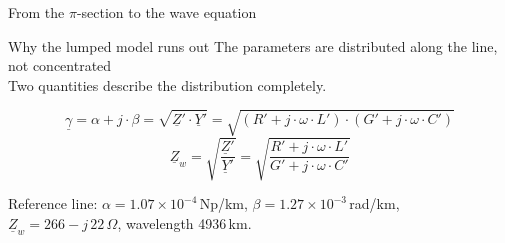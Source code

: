 %
\providecommand{\acfig}[1]{ac-transmission/fig/#1}


\begin{frame}{From the $\pi$-section to the wave equation}
  \begin{block}{Why the lumped model runs out}
    {The parameters are distributed along the line, not concentrated\\
    Two quantities describe the distribution completely.}
  \end{block}

  \vspace{0.6em}
  \setlength{\abovedisplayskip}{3pt}\setlength{\belowdisplayskip}{3pt}
  \[
    \underline{\gamma} = \alpha + j\cdot\beta
      = \sqrt{\underline{Z}'\cdot\underline{Y}'}
      = \sqrt{\left(R'+j\cdot\omega\cdot L'\right)\cdot
              \left(G'+j\cdot\omega\cdot C'\right)}
  \]
  \[
    \underline{Z}_w = \sqrt{\frac{\underline{Z}'}{\underline{Y}'}}
      = \sqrt{\frac{R'+j\cdot\omega\cdot L'}{G'+j\cdot\omega\cdot C'}}
  \]

  \vspace{0.5em}
  \centering
  {\color{atGray}\footnotesize Reference line:
  $\alpha = 1.07 \times 10^{-4}$\,Np/km,
  $\beta = 1.27 \times 10^{-3}$\,rad/km,
  $\underline{Z}_w = 266-j\,22\,\Omega$, wavelength 4936\,km.}
\end{frame}

